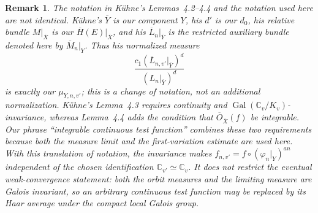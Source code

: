 \documentclass[10pt,a4paper]{amsart}
\theoremstyle{plain}
\newtheorem{remark}[theorem]{Remark}
\theoremstyle{plain}
\numberwithin{equation}{section}
\providecommand{\bM}{\overline{M}}
\begin{document}
\begin{remark}
	The notation in K\"uhne's Lemmas~4.2--4.4 and the notation used here are not
	identical.  K\"uhne's \(\overline Y\) is our component \(Y\), his \(d'\) is
	our \(d_0\), his relative bundle \(M|_{\overline X}\) is our
	\(\overline H(E)|_{\overline X}\), and his
	\(\overline L_n|_{\overline Y}\) is the restricted auxiliary bundle denoted
	here by \(\bM_n|_Y\).  Thus his normalized measure
	\[
	\frac{c_1(\overline L_{n,v'}|_{\overline Y})^d}
	{(L_n|_{\overline Y})^d}
	\]
	is exactly our \(\mu_{Y,n,v'}\); this is a change of notation, not an
	additional normalization.  K\"uhne's Lemma~4.3 requires continuity and
	\(\operatorname{Gal}(\mathbb C_v/K_v)\)-invariance, whereas Lemma~4.4 adds the
	condition that \(\overline O_{\overline X}(f)\) be integrable.  Our phrase
	``integrable continuous test function'' combines these two requirements
	because both the measure limit and the first-variation estimate are used here.
	With this translation of notation, the invariance makes
	\(f_{n,v'}=f\circ(\varphi_n|_Y)^{an}\) independent of the chosen
	identification \(\mathbb C_{v'}\simeq\mathbb C_v\).  It does not restrict the
	eventual weak-convergence statement: both the orbit measures and the limiting
	measure are Galois invariant, so an arbitrary continuous test function may be
	replaced by its Haar average under the compact local Galois group.
\end{remark}
\end{document}
